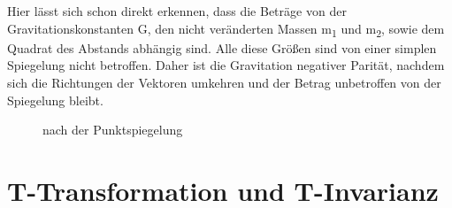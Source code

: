 \documentclass[12pt,a4paper]{scrartcl}
\numberwithin{equation}{section}
\begin{document}
Hier lässt sich schon direkt erkennen, dass die Beträge von der Gravitationskonstanten G, den nicht veränderten Massen m\textsubscript{1} und m\textsubscript{2}, sowie dem Quadrat des Abstands abhängig sind. Alle diese Größen sind von einer simplen Spiegelung nicht betroffen. Daher ist die Gravitation negativer Parität, nachdem sich die Richtungen der Vektoren umkehren und der Betrag unbetroffen von der Spiegelung bleibt.\cite{leeyang56, lueders54}
\begin{figure} [!ht]
\centering
{}
\caption{nach der Punktspiegelung}
\end{figure}

  \newpage  %

  \section{T-Transformation und T-Invarianz}
\end{document}
